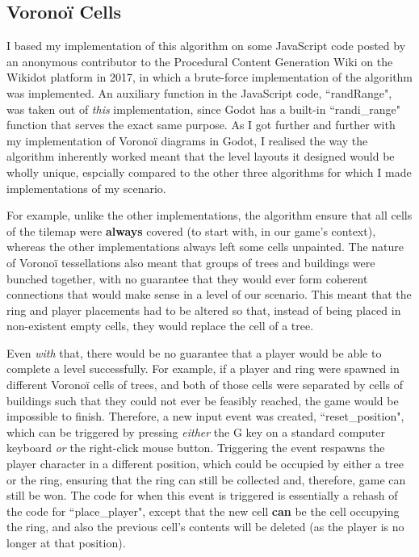 \subsection{Voronoï Cells} \label{voronoi1}

I based my implementation of this algorithm on some JavaScript code posted by an anonymous contributor to the Procedural Content Generation Wiki on the Wikidot platform in 2017, in which a brute-force implementation of the algorithm was implemented.\cite{pcgwikivoronoi} An auxiliary function in the JavaScript code, ``randRange", was taken out of \textit{this} implementation, since Godot has a built-in ``randi\_range" function that serves the exact same purpose.\cite{gdscriptdocs} As I got further and further with my implementation of Voronoï diagrams in Godot, I realised the way the algorithm inherently worked meant that the level layouts it designed would be wholly unique, espcially compared to the other three algorithms for which I made implementations of my scenario.

For example, unlike the other implementations, the algorithm ensure that all cells of the tilemap were \textbf{always} covered (to start with, in our game's context), whereas the other implementations always left some cells unpainted. The nature of Voronoï tessellations also meant that groups of trees and buildings were bunched together, with no guarantee that they would ever form coherent connections that would make sense in a level of our scenario. This meant that the ring and player placements had to be altered so that, instead of being placed in non-existent empty cells, they would replace the cell of a tree.

Even \textit{with} that, there would be no guarantee that a player would be able to complete a level successfully. For example, if a player and ring were spawned in different Voronoï cells of trees, and both of those cells were separated by cells of buildings such that they could not ever be feasibly reached, the game would be impossible to finish. Therefore, a new input event was created, ``reset\_position", which can be triggered by pressing \textit{either} the G key on a standard computer keyboard \textit{or} the right-click mouse button. Triggering the event respawns the player character in a different position, which could be occupied by either a tree or the ring, ensuring that the ring can still be collected and, therefore, game can still be won. The code for when this event is triggered is essentially a rehash of the code for ``place\_player", except that the new cell \textbf{can} be the cell occupying the ring, and also the previous cell's contents will be deleted (as the player is no longer at that position).

